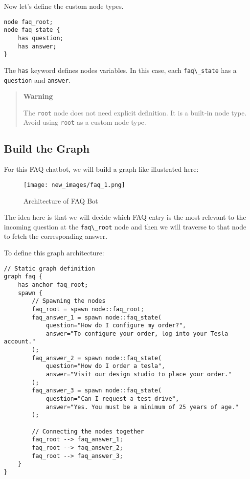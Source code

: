 Now let's define the custom node types.

\begin{lstlisting}
node faq_root;
node faq_state {
    has question;
    has answer;
}
\end{lstlisting}

The \passthrough{\lstinline!has!} keyword defines nodes variables. In
this case, each \passthrough{\lstinline!faq\_state!} has a
\passthrough{\lstinline!question!} and \passthrough{\lstinline!answer!}.

\begin{quote}
\textbf{Warning}

The \passthrough{\lstinline!root!} node does not need explicit
definition. It is a built-in node type. Avoid using
\passthrough{\lstinline!root!} as a custom node type.
\end{quote}

\hypertarget{build-the-graph}{%
\subsection{Build the Graph}\label{build-the-graph}}

For this FAQ chatbot, we will build a graph like illustrated here:

\begin{figure}
\centering
\texttt{[image: new\_images/faq\_1.png]}
\caption{Architecture of FAQ Bot}
\end{figure}

The idea here is that we will decide which FAQ entry is the most
relevant to the incoming question at the
\passthrough{\lstinline!faq\_root!} node and then we will traverse to
that node to fetch the corresponding answer.

To define this graph architecture:

\begin{lstlisting}
// Static graph definition
graph faq {
    has anchor faq_root;
    spawn {
        // Spawning the nodes
        faq_root = spawn node::faq_root;
        faq_answer_1 = spawn node::faq_state(
            question="How do I configure my order?",
            answer="To configure your order, log into your Tesla account."
        );
        faq_answer_2 = spawn node::faq_state(
            question="How do I order a tesla",
            answer="Visit our design studio to place your order."
        );
        faq_answer_3 = spawn node::faq_state(
            question="Can I request a test drive",
            answer="Yes. You must be a minimum of 25 years of age."
        );

        // Connecting the nodes together
        faq_root --> faq_answer_1;
        faq_root --> faq_answer_2;
        faq_root --> faq_answer_3;
    }
}
\end{lstlisting}

